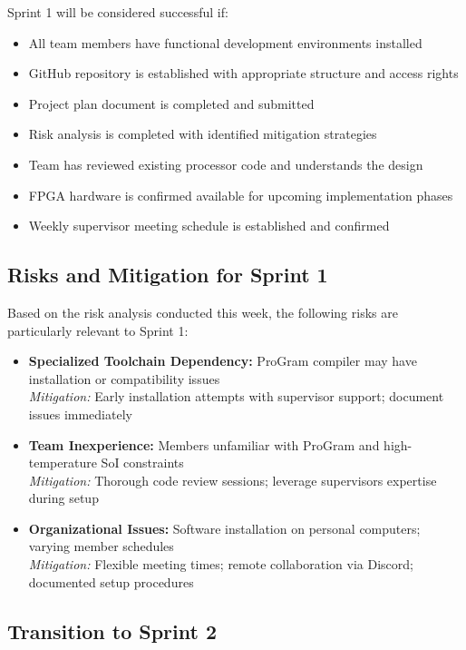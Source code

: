 \documentclass[10pt]{article}
\begin{document}
Sprint 1 will be considered successful if:
\begin{itemize}
    \item All team members have functional development environments installed
    \item GitHub repository is established with appropriate structure and access rights
    \item Project plan document is completed and submitted
    \item Risk analysis is completed with identified mitigation strategies
    \item Team has reviewed existing processor code and understands the design
    \item FPGA hardware is confirmed available for upcoming implementation phases
    \item Weekly supervisor meeting schedule is established and confirmed
\end{itemize}

\subsection{Risks and Mitigation for Sprint 1}

Based on the risk analysis conducted this week, the following risks are particularly relevant to Sprint 1:

\begin{itemize}
    \item \textbf{Specialized Toolchain Dependency:} ProGram compiler may have installation or compatibility issues\\
    \textit{Mitigation:} Early installation attempts with supervisor support; document issues immediately
    
    \item \textbf{Team Inexperience:} Members unfamiliar with ProGram and high-temperature SoI constraints\\
    \textit{Mitigation:} Thorough code review sessions; leverage supervisors expertise during setup
    
    \item \textbf{Organizational Issues:} Software installation on personal computers; varying member schedules\\
    \textit{Mitigation:} Flexible meeting times; remote collaboration via Discord; documented setup procedures
\end{itemize}

\subsection{Transition to Sprint 2}
\end{document}
